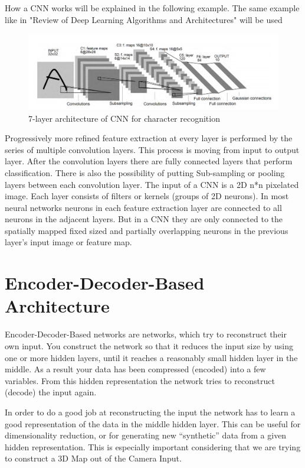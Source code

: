 How a CNN works will be explained in the following example. The same example like in "Review of Deep Learning Algorithms and Architectures"\cite{networks,exampleCNN} will be used
\begin{figure}[h]
	\centering
	\includegraphics[width=1.1\textwidth]{./media/images/CNN.PNG}
  	\caption{7-layer architecture of CNN for character recognition
  	\\ \cite[Fig.~4.]{networks,exampleCNN}}
  	\label{CNN}
\end{figure}

Progressively more refined feature extraction at every layer is performed by the series of multiple convolution layers. This process is moving from input to output layer. After the convolution layers there are fully connected layers that perform classification. There is also the possibility of putting Sub-sampling or pooling layers between each convolution layer. The input of a CNN is a 2D n*n pixelated image. Each layer consists of filters or kernels (groups of 2D neurons). In most neural networks neurons in each feature extraction layer are connected to all neurons in the adjacent layers. But in a CNN they are only connected to the spatially mapped fixed sized and partially overlapping neurons in the previous layer’s input image or feature map.

\section{Encoder-Decoder-Based Architecture}

Encoder-Decoder-Based networks are networks, which try to reconstruct their own input. You construct the network so that it reduces the input size by using one or more hidden layers, until it reaches a reasonably small hidden layer in the middle. As a result your data has been compressed (encoded) into a few variables. From this hidden representation the network tries to reconstruct (decode) the input again.

In order to do a good job at reconstructing the input the network has to learn a good representation of the data in the middle hidden layer. This can be useful for dimensionality reduction, or for generating new “synthetic” data from a given hidden representation. This is especially important considering that we are trying to construct a 3D Map out of the Camera Input. 









